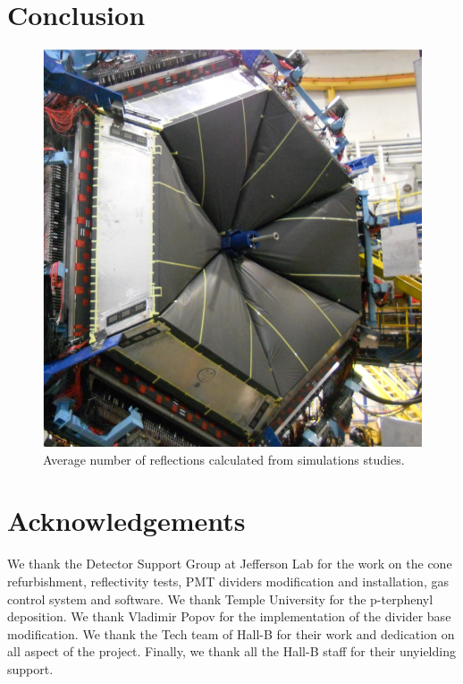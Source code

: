 \section{Conclusion}

\begin{figure}
	\centering
	\includegraphics[width=1.0\columnwidth,keepaspectratio]{img/ltccInstalled.png}
	\caption{Average number of reflections calculated from simulations studies.}
	\label{fig:ltccInstalled}
\end{figure}


\section{Acknowledgements}

We thank the Detector Support Group at Jefferson Lab for the work on the cone refurbishment, reflectivity tests, PMT dividers modification and installation, gas control system and software.
We thank Temple University for the p-terphenyl deposition. We thank Vladimir Popov for the implementation of the divider base modification. We thank the Tech team of Hall-B for their work
and dedication on all aspect of the project. Finally, we thank all the Hall-B staff for their unyielding support.

